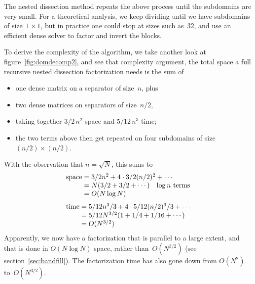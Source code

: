 The nested dissection method repeats the above process until the
subdomains are very small.  For a theoretical analysis, we keep
dividing until we have subdomains of size~$1\times1$, but in practice
one could stop at sizes such as~$32$, and use an efficient dense
solver to factor and invert the blocks.

To derive the complexity of the algorithm, we take another look at
figure~\ref{fig:domdecomp2}, and see that
complexity argument, the total space a full recursive nested
dissection factorization needs is the sum of
\begin{itemize}
\item one dense matrix on a separator of size~$n$, plus
\item two dense matrices on separators of size~$n/2$,
\item taking together $3/2\,n^2$ space and $5/12\,n^3$ time;
\item the two terms above then get repeated on four subdomains of
  size $(n/2)\times(n/2)$.
\end{itemize}
With the observation that $n=\sqrt N$, this sums to
\[ 
\begin{array}{r@{{}={}}l}
\mathrm{space}&3/2n^2+4\cdot 3/2(n/2)^2+\cdots\\
   & N(3/2+3/2+\cdots)\quad\hbox{$\log n$ terms}\\
   & O(N\log N)
\end{array}
\]
\[ 
\begin{array}{r@{{}={}}l}
\mathrm{time}&5/12n^3/3+4\cdot 5/12(n/2)^3/3+\cdots\\
   & 5/12 N^{3/2}(1+1/4+1/16+\cdots)\\
   & O(N^{3/2})
\end{array}
\]
Apparently, we now have a factorization that is parallel to a large
extent, and that is done in $O(N\log N)$ space, rather than~$O(N^{3/2})$
(see section~\ref{sec:bandfill}). The factorization time has also gone
down from $O(N^2)$ to~$O(N^{3/2})$.

